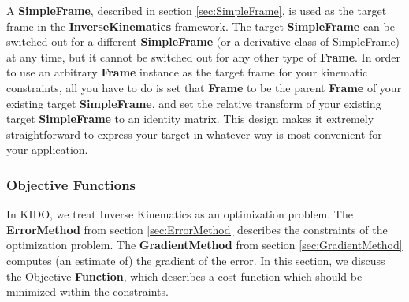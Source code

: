 A \textbf{SimpleFrame}, described in section \ref{sec:SimpleFrame}, is used as the target frame in the \textbf{InverseKinematics} framework. The target \textbf{SimpleFrame} can be  switched out for a different \textbf{SimpleFrame} (or a derivative class of SimpleFrame) at any time, but it cannot be switched out for any other type of \textbf{Frame}. In order to use an arbitrary \textbf{Frame} instance as the target frame for your kinematic constraints, all you have to do is set that \textbf{Frame} to be the parent \textbf{Frame} of your existing target \textbf{SimpleFrame}, and set the relative transform of your existing target \textbf{SimpleFrame} to an identity matrix. This design makes it extremely straightforward to express your target in whatever way is most convenient for your application.

\subsubsection{Objective Functions}

In KIDO, we treat Inverse Kinematics as an optimization problem. The \textbf{ErrorMethod} from section \ref{sec:ErrorMethod} describes the constraints of the optimization problem. The \textbf{GradientMethod} from section \ref{sec:GradientMethod} computes (an estimate of) the gradient of the error. In this section, we discuss the Objective \textbf{Function}, which describes a cost function which should be minimized within the constraints.

